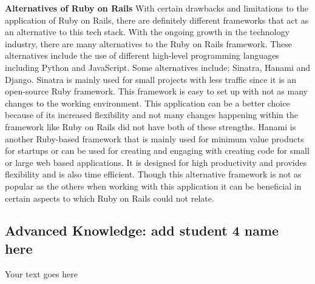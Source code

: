 \documentclass[a4paper, 11pt]{report}
\begin{document}
\textbf{Alternatives of Ruby on Rails}
With certain drawbacks and limitations to the application of Ruby on Rails, there are definitely different frameworks that act as an alternative to this tech stack. With the ongoing growth in the technology industry, there are many alternatives to the Ruby on Rails framework. These alternatives include the use of different high-level programming languages including Python and JavaScript. Some alternatives include; Sinatra, Hanami and Django. Sinatra is mainly used for small projects with less traffic since it is an open-source Ruby framework. This framework is easy to set up with not as many changes to the working environment. This application can be a better choice because of its increased flexibility and not many changes happening within the framework like Ruby on Rails did not have both of these strengths. Hanami is another Ruby-based framework that is mainly used for minimum value products for startups or can be used for creating and engaging with creating code for small or large web based applications. It is designed for high productivity and provides flexibility and is also time efficient. Though this alternative framework is not as popular as the others when working with this application it can be beneficial in certain aspects to which Ruby on Rails could not relate.


\subsection{Advanced Knowledge: add student 4 name here}

Your text goes here




\newpage



\end{document}
